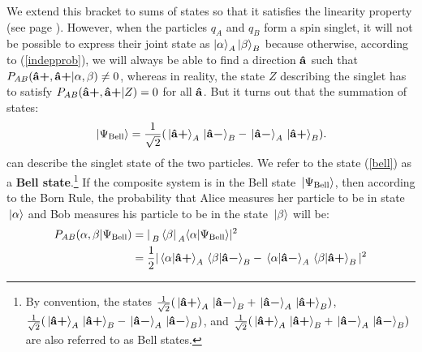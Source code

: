 %
We extend this bracket to sums of states so that it satisfies the linearity property (see page \pageref{linearity}).
However, when the particles $q_A$ and $q_B$ form a spin singlet, it will not be possible to express their joint state as $\ket{\alpha}_A\ket{\beta}_B$ because otherwise, according to (\ref{indepprob}), we will always be able to find a direction $\vb{\hat{{a}}}$ such that $P_{AB}({\vb{\hat{{a}}}\bm{+}}, {\vb{\hat{{a}}}\bm{+}}|\alpha, \beta)\neq 0$, whereas in reality, the state $Z$ describing the singlet has to satisfy $P_{AB}({\vb{\hat{{a}}}\bm{+}}, {\vb{\hat{{a}}}\bm{+}}|Z)=0$ for all  $\vb{\hat{{a}}}$.
But it turns out that the summation of states:
\begin{equation}\label{bell}
    \ket*{\Psi_{\text{Bell}}}=\frac{1}{\sqrt{2}}(\ket*{{\vb{\hat{{a}}}\bm{+}}}_A\ket*{{\vb{\hat{{a}}}\bm{-}}}_B-\ket*{{\vb{\hat{{a}}}\bm{-}}}_A\ket*{{\vb{\hat{{a}}}\bm{+}}}_B).
\end{equation} %
%
can describe the singlet state of the two particles. We refer to the state (\ref{bell}) as a \textbf{Bell state}.\footnote{By convention, the states $ \frac{1}{\sqrt{2}}(\ket*{{\vb{\hat{{a}}}\bm{+}}}_A\ket*{{\vb{\hat{{a}}}\bm{-}}}_B+\ket*{{\vb{\hat{{a}}}\bm{-}}}_A\ket*{{\vb{\hat{{a}}}\bm{+}}}_B)$, $ \frac{1}{\sqrt{2}}(\ket*{{\vb{\hat{{a}}}\bm{+}}}_A\ket*{{\vb{\hat{{a}}}\bm{+}}}_B-\ket*{{\vb{\hat{{a}}}\bm{-}}}_A\ket*{{\vb{\hat{{a}}}\bm{-}}}_B)$, and $ \frac{1}{\sqrt{2}}(\ket*{{\vb{\hat{{a}}}\bm{+}}}_A\ket*{{\vb{\hat{{a}}}\bm{+}}}_B+\ket*{{\vb{\hat{{a}}}\bm{-}}}_A\ket*{{\vb{\hat{{a}}}\bm{-}}}_B)$ are also referred to as Bell states.} If the composite system is in the Bell state $\ket*{\Psi_{\text{Bell}}}$, then according to the Born Rule, the probability that Alice measures her particle to be in state $\ket*{\alpha}$ and Bob measures his particle to be in the state $\ket*{\beta}$ will be:
\begin{equation}
\begin{split}
    P_{AB}(\alpha, \beta|\Psi_{\text{Bell}})&=|\prescript{}{B}{ \bra*{\beta}}\prescript{}{A}{ \ip{\alpha}{\Psi_{\text{Bell}}}}|^2\\
        &=\frac{1}{2}|\ip*{\alpha}{\uvbp{a}}_A\ip*{\beta}{\uvbm{a}}_B-\ip*{\alpha}{\uvbm{a}}_A\ip*{\beta}{\uvbp{a}}_B|^2
\end{split}
\end{equation}
